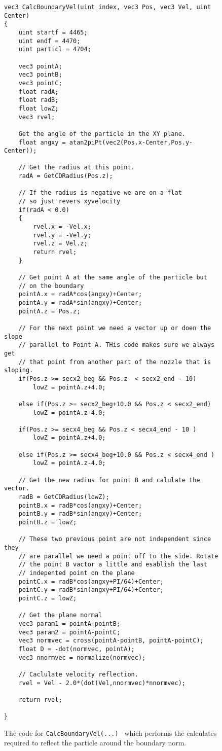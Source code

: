 
\begin{figure}[h]
\centering
\lstset{style=gpucode,linewidth=6.5in,xleftmargin=0.25in}

\begin{lstlisting}
vec3 CalcBoundaryVel(uint index, vec3 Pos, vec3 Vel, uint Center) 
{
	uint startf = 4465;
	uint endf = 4470;
	uint particl = 4704;
	
	vec3 pointA;
	vec3 pointB;
	vec3 pointC;
	float radA;
	float radB;
	float lowZ;
	vec3 rvel;
	
	Get the angle of the particle in the XY plane.
	float angxy = atan2piPt(vec2(Pos.x-Center,Pos.y-Center));
	
	// Get the radius at this point.
	radA = GetCDRadius(Pos.z);
	
	// If the radius is negative we are on a flat 
	// so just revers xyvelocity
	if(radA < 0.0)
	{
		rvel.x = -Vel.x;
		rvel.y = -Vel.y;
		rvel.z = Vel.z;
		return rvel;
	}

	// Get point A at the same angle of the particle but
	// on the boundary
	pointA.x = radA*cos(angxy)+Center;
	pointA.y = radA*sin(angxy)+Center;
	pointA.z = Pos.z;

	// For the next point we need a vector up or doen the slope
	// parallel to Point A. THis code makes sure we always get
	// that point from another part of the nozzle that is sloping.
	if(Pos.z >= secx2_beg && Pos.z  < secx2_end - 10) 
		lowZ = pointA.z+4.0;
		
	else if(Pos.z >= secx2_beg+10.0 && Pos.z < secx2_end)
		lowZ = pointA.z-4.0;
		
	if(Pos.z >= secx4_beg && Pos.z < secx4_end - 10 ) 
		lowZ = pointA.z+4.0;
		
	else if(Pos.z >= secx4_beg+10.0 && Pos.z < secx4_end )
		lowZ = pointA.z-4.0;	
	
	// Get the new radius for point B and calulate the vector.
	radB = GetCDRadius(lowZ);
	pointB.x = radB*cos(angxy)+Center;
	pointB.y = radB*sin(angxy)+Center;
	pointB.z = lowZ;

	// These two previous point are not independent since they
	// are parallel we need a point off to the side. Rotate
	// the point B vactor a little and esablish the last 
	// indepented point on the plane    
	pointC.x = radB*cos(angxy+PI/64)+Center;
	pointC.y = radB*sin(angxy+PI/64)+Center;
	pointC.z = lowZ;
		
	// Get the plane normal
	vec3 param1 = pointA-pointB;
	vec3 param2 = pointA-pointC;
	vec3 normvec = cross(pointA-pointB, pointA-pointC);
	float D = -dot(normvec,	pointA);
    vec3 nnormvec = normalize(normvec);
	
	// Caclulate velocity reflection.
	rvel = Vel - 2.0*(dot(Vel,nnormvec)*nnormvec);

	return rvel;

}
\end{lstlisting}


\caption[Benchset test configuration file]{The code for \texttt{CalcBoundaryVel(...) } which performs the calculates required to reflect the particle around the boundary norm.}
\label{fig:CalcBoundaryVel}
\end{figure}
